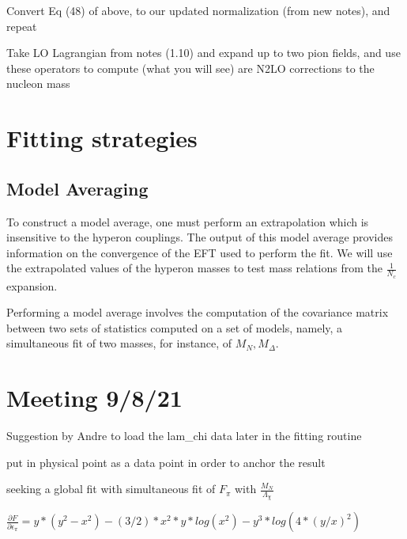 \documentclass[12pt,tightenlines, raggedbottom, prd, notitlepage]{revtex4-1}
\begin{document}
Convert Eq (48) of above, to our updated normalization (from new notes), and repeat

Take LO Lagrangian from notes (1.10) and expand up to two pion fields, and use these operators to compute (what you will see) are N2LO corrections to the nucleon mass


\section*{Fitting strategies}

\subsection*{Model Averaging}
To construct a model average, one must perform an extrapolation which is insensitive
to the hyperon couplings. The output of this model average provides information on the 
convergence of the EFT used to perform the fit. We will use the extrapolated values of 
the hyperon masses to test mass relations from the $\frac{1}{N_c}$ expansion.

Performing a model average involves the computation of the covariance matrix between
two sets of statistics computed on a set of models, namely, a simultaneous fit of two 
masses, for instance, of $M_N , M_\Delta$. 

\section{Meeting 9/8/21}
Suggestion by Andre to load the lam_chi data later in the fitting routine 

put in physical point as a data point in order to anchor the result 

seeking a global fit with simultaneous fit of $F_\pi$ with $\frac{M_N}{\Lambda_\chi}$ 

\appendix
$ \frac{\partial F}{\partial \epsilon_\pi} = y *(y^2 - x^2) - (3/2) *x^2 *y *log(x^2)- y^3 *log(4 *(y/x)^2)$
\end{document}
